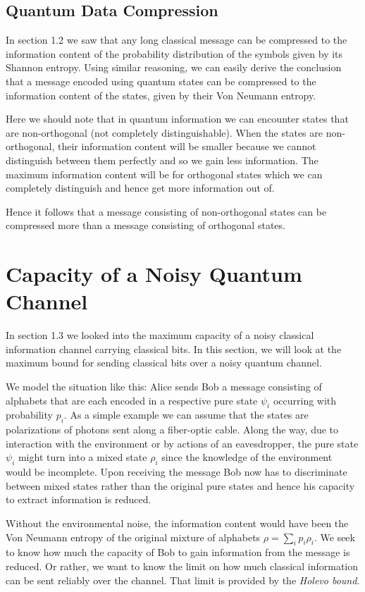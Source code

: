 \subsection{Quantum Data Compression}
\par In section 1.2 we saw that any long classical message can be compressed to the information content of the probability distribution of the symbols given by its Shannon entropy. Using similar reasoning, we can easily derive the conclusion that a message encoded using quantum states can be compressed to the information content of the states, given by their Von Neumann entropy.
\par Here we should note that in quantum information we can encounter states that are non-orthogonal (not completely distinguishable). When the states are non-orthogonal, their information content will be smaller because we cannot distinguish between them perfectly and so we gain less information. The maximum information content will be for orthogonal states which we can completely distinguish and hence get more information out of.
\par Hence it follows that a message consisting of non-orthogonal states can be compressed more than a message consisting of orthogonal states.

\section{Capacity of a Noisy Quantum Channel}
\par In section 1.3 we looked into the maximum capacity of a noisy classical information channel carrying classical bits. In this section, we will look at the maximum bound for sending classical bits over a noisy quantum channel.
\par We model the situation like this: Alice sends Bob a message consisting of alphabets that are each encoded in a respective pure state $\psi_i$ occurring with probability $p_i$. As a simple example we can assume that the states are polarizations of photons sent along a fiber-optic cable. Along the way, due to interaction with the environment or by actions of an eavesdropper, the pure state $\psi_i$ might turn into a mixed state $\rho_i$ since the knowledge of the environment would be incomplete. Upon receiving the message Bob now has to discriminate between mixed states rather than the original pure states and hence his capacity to extract information is reduced.
\par Without the environmental noise, the information content would have been the Von Neumann entropy of the original mixture of alphabets $\rho = \sum_i p_i \rho_i$. We seek to know how much the capacity of Bob to gain information from the message is reduced. Or rather, we want to know the limit on how much classical information can be sent reliably over the channel. That limit is provided by the \textit{Holevo bound}.
